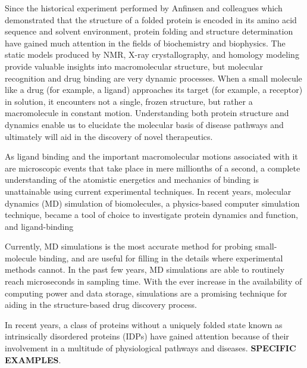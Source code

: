 Since the historical experiment performed by Anfinsen and colleagues which demonstrated that the structure of a folded protein is encoded in its amino acid sequence and solvent environment, protein folding and structure determination have gained much attention in the fields of biochemistry and biophysics.  The static models produced by NMR, X-ray crystallography, and homology modeling provide valuable insights into macromolecular structure, but molecular recognition and drug binding are very dynamic processes.  When a small molecule like a drug (for example, a ligand) approaches its target (for example, a receptor) in solution, it encounters not a single, frozen structure, but rather a macromolecule in constant motion. Understanding both protein structure and dynamics enable us to elucidate the molecular basis of disease pathways and ultimately will aid in the discovery of novel therapeutics. 

As ligand binding and the important macromolecular motions associated with it are microscopic events that take place in mere millionths of a second, a complete understanding of the atomistic energetics and mechanics of binding is unattainable using current experimental techniques. In recent years, molecular dynamics (MD) simulation of biomolecules, a physics-based computer simulation technique, became a tool of choice to investigate protein dynamics and function, and ligand-binding

Currently, MD simulations is the most accurate method for probing small-molecule binding, and are useful for filling in the details where experimental methods cannot.\cite{Durrant:2011bm} In the past few years, MD simulations are able to routinely reach microseconds in sampling time. With the ever increase in the availability of computing power and data storage, simulations are a promising technique for aiding in the structure-based drug discovery process. 

In recent years, a class of proteins without a uniquely folded state known as intrinsically disordered proteins (IDPs) have gained attention because of their involvement in a multitude of physiological pathways and diseases. \textbf{SPECIFIC EXAMPLES}.\cite{d2, dobson, sarah's thesis, caflisch disordered binding} 

